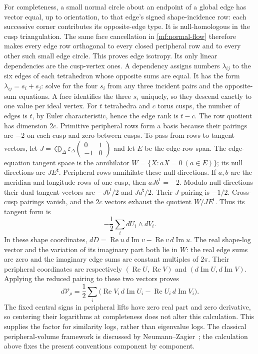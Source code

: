 \documentclass[11pt]{article}
\numberwithin{equation}{section}
\theoremstyle{definition}
\theoremstyle{remark}
\newcommand{\Rea}{\operatorname{Re}}
\newcommand{\Ima}{\operatorname{Im}}
\begin{document}
For completeness, a small normal circle about an endpoint of a
global edge has vector equal, up to orientation, to that edge's
signed shape-incidence row: each successive corner contributes its
opposite-edge type. It is null-homologous in the cusp triangulation.
The same face cancellation in \eqref{mf:normal-flow} therefore makes
every edge row orthogonal to every closed peripheral row and to
every other such small edge circle. This proves edge isotropy.
Its only linear dependencies are the cusp-vertex ones. A dependency assigns numbers
\(\lambda_{ij}\) to the six edges of each tetrahedron whose opposite
sums are equal. It has the form
\(\lambda_{ij}=s_i+s_j\): solve for the four \(s_i\) from any
three incident pairs and the opposite-sum equations.
A face identifies the three \(s_i\) uniquely, so they descend exactly
to one value per ideal vertex. For \(t\) tetrahedra and \(c\) torus
cusps, the number of edges is \(t\), by Euler characteristic, hence
the edge rank is \(t-c\). The row quotient has dimension \(2c\).
Primitive peripheral rows form a basis because their pairings are
\(-2\) on each cusp and zero between cusps. To pass from rows to
tangent vectors, let
\(J=\bigoplus_\Delta\varepsilon_\Delta
\left(\begin{smallmatrix}0&1\\-1&0\end{smallmatrix}\right)\)
and let \(E\) be the edge-row span.
The edge-equation tangent space is the annihilator
\(W=\{X:aX=0\ (a\in E)\}\); its null directions are \(JE^{\mathsf t}\).
Peripheral rows annihilate these null directions.
If \(a,b\) are the meridian and longitude rows of one cusp, then
\(aJb^{\mathsf t}=-2\).
Modulo null directions their dual tangent vectors are
\(-Jb^{\mathsf t}/2\) and \(Ja^{\mathsf t}/2\).
Their \(J\)-pairing is \(-1/2\).
Cross-cusp pairings vanish, and the \(2c\) vectors exhaust the
quotient \(W/JE^{\mathsf t}\). Thus its tangent form is
\[
                   -\frac12\sum_i dU_i\wedge dV_i.
\]
In these shape coordinates,
\(dD=\Rea u\,d\Ima v-\Rea v\,d\Ima u\).
The real shape-log vector and the variation of its imaginary part
both lie in \(W\): the real edge sums are zero
and the imaginary edge sums are constant multiples of \(2\pi\).
Their peripheral coordinates are respectively
\((\Rea U,\Rea V)\) and \((d\Ima U,d\Ima V)\).
Applying the reduced pairing to these two vectors proves
\begin{equation}\label{mf:volume-differential}
 d\mathcal V_\rho
   =\frac12\sum_i
       \bigl(\Rea V_i\,d\Ima U_i-\Rea U_i\,d\Ima V_i\bigr).
\end{equation}
The fixed central signs in peripheral lifts have zero real part and
zero derivative, so centering their logarithms at completeness does
not alter this calculation. This supplies the factor for similarity
logs, rather than eigenvalue logs.
The classical peripheral-volume framework is discussed by
Neumann--Zagier~\cite{NeumannZagier}; the calculation above fixes the
present conventions component by component.
\end{document}
